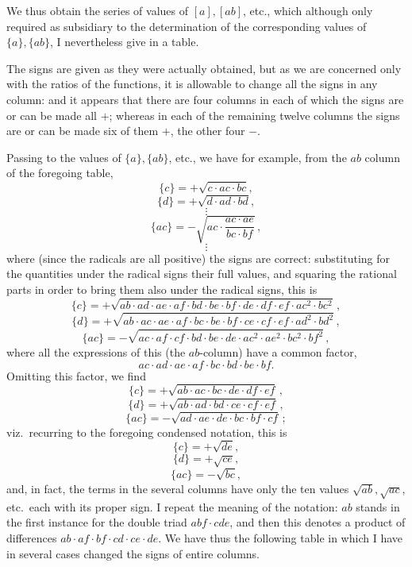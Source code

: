 \documentclass[11pt,a4paper]{article}
\begin{document}
\medskip

We thus obtain the series of values of $[a], [ab]$, etc., which although only required as subsidiary to the determination of the corresponding values of $\{a\}, \{ab\}$, I nevertheless give in a table.

\medskip

The signs are given as they were actually obtained, but as we are concerned only with the ratios of the functions, it is allowable to change all the signs in any column: and it appears that there are four columns in each of which the signs are or can be made all $+$; whereas in each of the remaining twelve columns the signs are or can be made six of them $+$, the other four $-$.

\newpage


\noindent Passing to the values of $\{a\}, \{ab\}$, etc., we have for example, from the $ab$ column of the foregoing table,
\[
\{c\} = + \sqrt{c \cdot ac \cdot bc},
\]
\[
\{d\} = + \sqrt{d \cdot ad \cdot bd},
\]
\[
\vdots
\]
\[
\{ac\} = -\sqrt{ac \cdot \dfrac{ac \cdot ae}{bc \cdot bf}}\,,
\]
\[
\vdots
\]
where (since the radicals are all positive) the signs are correct: substituting for the quantities under the radical signs their full values, and squaring the rational parts in order to bring them also under the radical signs, this is
\[
\{c\} = +\sqrt{ab \cdot ad \cdot ae \cdot af \cdot bd \cdot be \cdot bf \cdot de \cdot df \cdot ef \cdot ac^{2} \cdot bc^{2}}\,,
\]
\[
\{d\} = +\sqrt{ab \cdot ac \cdot ae \cdot af \cdot bc \cdot be \cdot bf \cdot ce \cdot cf \cdot ef \cdot ad^{2} \cdot bd^{2}}\,,
\]
\[
\{ac\} = -\sqrt{ac \cdot af \cdot cf \cdot bd \cdot be \cdot de \cdot ac^{2} \cdot ae^{2} \cdot bc^{2} \cdot bf^{2}}\,,
\]
where all the expressions of this (the $ab$-column) have a common factor,
\[
ac \cdot ad \cdot ae \cdot af \cdot bc \cdot bd \cdot be \cdot bf.
\]
Omitting this factor, we find
\[
\{c\} = +\sqrt{ab \cdot ac \cdot bc \cdot de \cdot df \cdot ef}\,,
\]
\[
\{d\} = +\sqrt{ab \cdot ad \cdot bd \cdot ce \cdot cf \cdot ef}\,,
\]
\[
\{ac\} = -\sqrt{ad \cdot ae \cdot de \cdot bc \cdot bf \cdot cf}\,;
\]
viz.\ recurring to the foregoing condensed notation, this is
\[
\{c\} = +\sqrt{de},
\]
\[
\{d\} = +\sqrt{ce},
\]
\[
\{ac\} = -\sqrt{bc},
\]
and, in fact, the terms in the several columns have only the ten values $\sqrt{ab}, \sqrt{ac}$, etc.\ each with its proper sign. I repeat the meaning of the notation: $ab$ stands in the first instance for the double triad $abf \cdot cde$, and then this denotes a product of differences $ab \cdot af \cdot bf \cdot cd \cdot ce \cdot de$. We have thus the following table in which I have in several cases changed the signs of entire columns.
\end{document}
